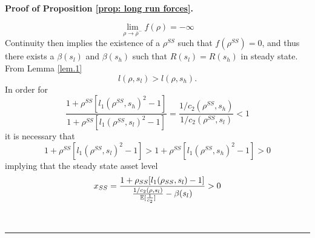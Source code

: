\documentclass[thmsb,11pt]{article}
\newenvironment{proof}[1][Proof]{\noindent \textbf{#1.} }{\  \rule{0.5em}{0.5em}}
\begin{document}
\begin{proof}[Proof of Proposition \ref{prop: long run forces}]
\begin{description}
\begin{equation*}
\lim_{\rho\rightarrow\overline\rho^-} f(\rho) = -\infty
\end{equation*}
Continuity then implies the existence of a $\rho^{SS}$ such that $%
f(\rho^{SS}) = 0$, and thus there exists a $\beta(s_l)$ and $\beta(s_h)$
such that $R(s_l) = R(s_h)$ in steady state. From Lemma \ref{lem.1}
\begin{equation*}
l(\rho,s_l) > l(\rho,s_h).
\end{equation*}
In order for
\begin{equation*}
\frac{1+\rho^{SS}[l_1(\rho^{SS},s_h)^2-1]}{1+\rho^{SS}[l_1(%
\rho^{SS},s_l)^2-1]} = \frac{1/c_2(\rho^{SS},s_h)}{1/c_2(\rho^{SS},s_l)} < 1
\end{equation*}
it is necessary that
\begin{equation*}
1+\rho^{SS}[l_1(\rho^{SS},s_l)^2-1] > 1+\rho^{SS}[l_1(\rho^{SS},s_h)^2-1] > 0
\end{equation*}
implying that the steady state asset level
\begin{equation*}
x_{SS} = \frac{1+\rho_{SS}[l_1(\rho_{SS},s_l)-1]}{\frac{1/c_2(\rho,s_l)}{%
\mathbb{E}[\frac1{c_2}]}-\beta(s_l)} >0
\end{equation*}


\end{description}
\end{proof}
\end{document}
